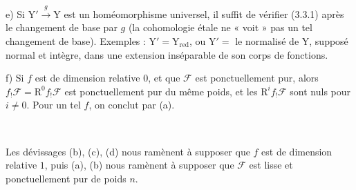 \documentclass[11pt,leqno]{article}
\newcommand{\Page}[1]{\ifvmode\noindent\else\unskip\ \fi{\footnotesize\textcolor{gray}{[p.\,#1]}}\ \ignorespaces}
\begin{document}
e) Si \(\mathrm{Y}'\xrightarrow{g}\mathrm{Y}\) est un homéomorphisme universel, il suffit de vérifier (3.3.1) après le changement de base par \(g\) (la cohomologie étale ne « voit » pas un tel changement de base). Exemples : \(\mathrm{Y}'=\mathrm{Y}_{\mathrm{red}}\), ou \(\mathrm{Y}'=\) le normalisé de \(\mathrm{Y}\), supposé normal et intègre, dans une extension inséparable de son corps de fonctions.

f) Si \(f\) est de dimension relative \(0\), et que \(\mathscr{F}\) est ponctuellement pur, alors \(f_!\mathscr{F}=\mathrm{R}^0f_!\mathscr{F}\) est ponctuellement pur du même poids, et les \(\mathrm{R}^if_!\mathscr{F}\) sont nuls pour \(i\neq0\). Pour un tel \(f\), on conclut par (a).

\Page{205}

Les dévissages (b), (c), (d) nous ramènent à supposer que \(f\) est de dimension relative \(1\), puis (a), (b) nous ramènent à supposer que \(\mathscr{F}\) est lisse et ponctuellement pur de poids \(n\).
\end{document}
